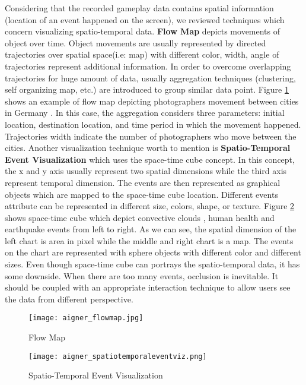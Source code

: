 Considering that the recorded gameplay data contains spatial information (location of an event happened on the screen), we reviewed techniques which concern visualizing spatio-temporal data. \textbf{Flow Map} depicts movements of object over time. Object movements are usually represented by directed trajectories over spatial space(i.e: map) with different color, width, angle of trajectories represent additional information. In order to overcome overlapping trajectories for huge amount of data, usually aggregation techniques (clustering, self organizing map, etc.) are introduced to group similar data point. Figure \ref{flow_map} shows an example of flow map depicting photographers movement between cities in Germany \cite{adrienko}. In this case, the aggregation considers three parameters: initial location, destination location, and time period in which the movement happened. Trajectories width indicate the number of photographers who move between the cities. Another visualization technique worth to mention is \textbf{Spatio-Temporal Event Visualization} which uses the space-time cube concept. In this concept, the x and y axis usually represent two spatial dimensions while the third axis represent temporal dimension. The events are then represented as graphical objects which are mapped to the space-time cube location. Different events attribute can be represented in different size, colors, shape, or texture. Figure \ref{spatio_temporal} shows space-time cube which depict convective clouds \cite{turdukulov}, human health \cite{tominski} and earthquake events \cite{gatalsky} from left to right. As we can see, the  spatial dimension of the left chart is area in pixel while the middle and right chart is a map. The events on the chart are represented with sphere objects with different color and different sizes. Even though space-time cube can portrays the spatio-temporal data, it has some downside. When there are too many events, occlusion is inevitable. It should be coupled with an appropriate interaction technique to allow users see the data from different perspective.

\begin{figure}
\centering
\texttt{[image: aigner\_flowmap.jpg]}
\caption{Flow Map}
\label{flow_map}
\end{figure}

\begin{figure}
\centering
\texttt{[image: aigner\_spatiotemporaleventviz.png]}
\caption{Spatio-Temporal Event Visualization}
\label{spatio_temporal}
\end{figure}

